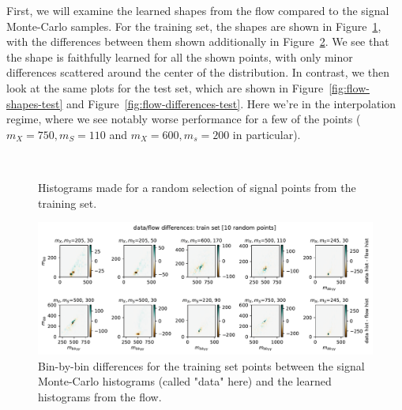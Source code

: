 \documentclass[
  11pt,
  numbers=noendperiod]{book}
\begin{document}
First, we will examine the learned shapes from the flow compared to the signal Monte-Carlo samples. For the training set, the shapes are shown in Figure~\ref{fig:flow-shapes-train}, with the differences between them shown additionally in Figure~\ref{fig:flow-differences-train}. We see that the shape is faithfully learned for all the shown points, with only minor differences scattered around the center of the distribution. In contrast, we then look at the same plots for the test set, which are shown in Figure~\ref{fig:flow-shapes-test} and Figure~\ref{fig:flow-differences-test}. Here we're in the interpolation regime, where we see notably worse performance for a few of the points ($m_X=750, m_S=110$ and $m_X=600, m_s=200$ in particular).

\begin{figure}[ht]
\\
\caption{Histograms made for a random selection of signal points from the training set.}
\label{fig:flow-shapes-train}
\end{figure}

\begin{figure}[ht]
  \centering
  \includegraphics[width=\textwidth]{./images/diff-hists-train.pdf}
  \caption{\label{fig:flow-differences-train}Bin-by-bin differences for the training set points between the signal Monte-Carlo histograms (called "data" here) and the learned histograms from the flow.}
\end{figure}
\end{document}
